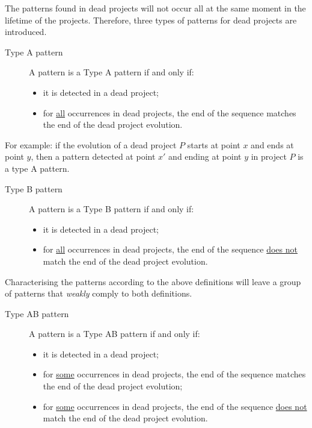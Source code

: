 The patterns found in dead projects will not occur all at the same moment in
the lifetime of the projects. Therefore, three types of patterns for dead
projects are introduced.

\vspace{1em}
\label{def:pattern_typea}
\begin{description}
	\item[Type A pattern]
		A pattern is a Type A pattern if and only if:
		\begin{itemize}
			\item it is detected in a dead project;
			\item for \underline{all} occurrences in dead projects, the end of the
				sequence matches the end of the dead project evolution.
		\end{itemize}
\end{description}

\vspace{1em}
\noindent
For example: if the evolution of a dead project $P$ starts at point $x$ and ends
at point $y$, then a pattern detected at point $x'$ and ending at point $y$ in
project $P$ is a type A pattern.

\vspace{1em}
\label{def:pattern_typeb}
\begin{description}
	\item[Type B pattern]
		A pattern is a Type B pattern if and only if:
		\begin{itemize}
			\item it is detected in a dead project;
			\item for \underline{all} occurrences in dead projects, the end of the
				sequence \underline{does not} match the end of the dead project evolution.
		\end{itemize}
\end{description}

\vspace{1em}
\noindent
Characterising the patterns according to the above definitions will leave a
group of patterns that \textit{weakly} comply to both definitions.

\vspace{1em}
\label{def:pattern_typeab}
\begin{description}
	\item[Type AB pattern]
		A pattern is a Type AB pattern if and only if:
		\begin{itemize}
			\item it is detected in a dead project;
			\item for \underline{some} occurrences in dead projects, the end of the
				sequence matches the end of the dead project evolution;
			\item for \underline{some} occurrences in dead projects, the end of the
				sequence \underline{does not} match the end of the dead project evolution.
		\end{itemize}
\end{description}

